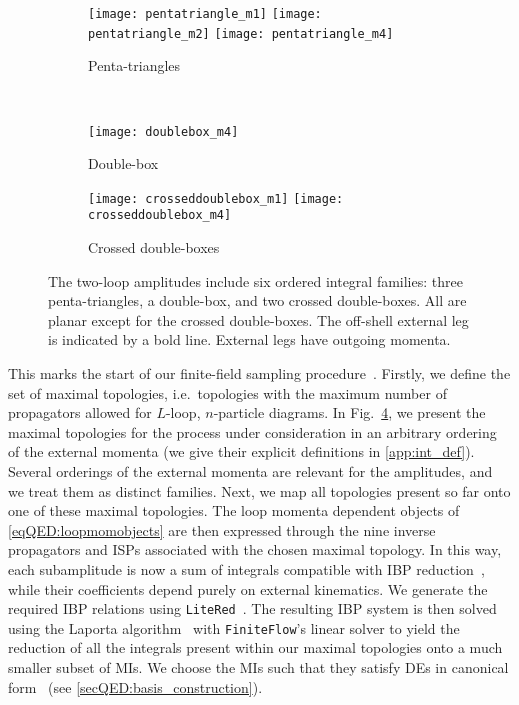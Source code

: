 \documentclass[main.tex]{subfiles}
\begin{document}
\begin{figure}
    \begin{center}
        \begin{subfigure}[c]{\linewidth}
            \centering
            \texttt{[image: pentatriangle\_m1]}
            \texttt{[image: pentatriangle\_m2]}
            \texttt{[image: pentatriangle\_m4]}
            \caption{Penta-triangles}
            \label{fig:pentatriangle}
        \end{subfigure}
        \\
        \vspace{1em}
        \begin{subfigure}[c]{0.3\linewidth}
            \centering
            \texttt{[image: doublebox\_m4]}
            \caption{Double-box}
            \label{fig:double-box}
        \end{subfigure}
        \begin{subfigure}[c]{0.6\linewidth}
            \centering
            \texttt{[image: crosseddoublebox\_m1]}
            \texttt{[image: crosseddoublebox\_m4]}
            \caption{Crossed double-boxes}
            \label{fig:crosseddouble-box}
        \end{subfigure}
    \end{center}
    \caption{ 
        The two-loop amplitudes include six ordered integral families: three penta-triangles, a double-box, and two crossed double-boxes.
        All are planar except for the crossed double-boxes.
        The off-shell external leg is indicated by a bold line.
        External legs have outgoing momenta.
    }
    \label{fig:int-fams}
\end{figure}
This marks the start of our finite-field sampling
procedure~\cite{Peraro:2016wsq}. 
Firstly, we define the set of maximal topologies, i.e.~topologies with the maximum number of propagators allowed for $L$-loop, $n$-particle diagrams. In Fig.~\ref{fig:int-fams}, we present the maximal topologies for the process under consideration in an arbitrary ordering of the external momenta (we give their explicit definitions in \cref{app:int_def}). Several orderings of the external momenta are relevant for the amplitudes, and we treat them as distinct families. Next, we map all topologies present so far onto one of these maximal topologies. The loop momenta dependent objects of \cref{eqQED:loopmomobjects} are then expressed through the nine inverse propagators and ISPs associated with the chosen maximal topology. In this way, each subamplitude is now a sum of integrals compatible with IBP reduction~\cite{Tkachov:1981wb,Chetyrkin:1981qh}, while their coefficients depend purely on external kinematics. We generate the required IBP relations using \texttt{LiteRed}~\cite{Lee:2012cn}. The resulting IBP system is then solved using the Laporta algorithm~\cite{Laporta:2001dd} with \texttt{FiniteFlow}'s linear solver to yield the reduction of all the integrals present within our maximal topologies onto a much smaller subset of MIs. We choose the MIs such that they satisfy DEs in canonical form~\cite{Henn:2013pwa} (see \cref{secQED:basis_construction}). 
\end{document}
